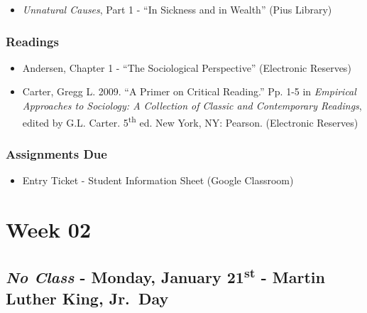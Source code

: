 \documentclass[]{book}
\providecommand{\tightlist}{%
  \setlength{\itemsep}{0pt}\setlength{\parskip}{0pt}}
\begin{document}
\begin{itemize}
\tightlist
\item
  \emph{Unnatural Causes}, Part 1 - ``In Sickness and in Wealth'' (Pius Library)
\end{itemize}

\hypertarget{readings-1}{%
\subsubsection*{Readings}\label{readings-1}}

\begin{itemize}
\tightlist
\item
  Andersen, Chapter 1 - ``The Sociological Perspective'' (Electronic Reserves)
\item
  Carter, Gregg L. 2009. ``A Primer on Critical Reading.'' Pp. 1-5 in \emph{Empirical Approaches to Sociology: A Collection of Classic and Contemporary Readings}, edited by G.L. Carter. 5\textsuperscript{th} ed. New York, NY: Pearson. (Electronic Reserves)
\end{itemize}

\hypertarget{assignments-due}{%
\subsubsection*{Assignments Due}\label{assignments-due}}

\begin{itemize}
\tightlist
\item
  Entry Ticket - Student Information Sheet (Google Classroom)
\end{itemize}

\hypertarget{week-02}{%
\section*{Week 02}\label{week-02}}

\hypertarget{no-class---monday-january-21st---martin-luther-king-jr.day}{%
\subsection*{\texorpdfstring{\emph{No Class} - Monday, January 21\textsuperscript{st} - Martin Luther King, Jr.~Day}{No Class - Monday, January 21st - Martin Luther King, Jr.~Day}}\label{no-class---monday-january-21st---martin-luther-king-jr.day}}
\end{document}
